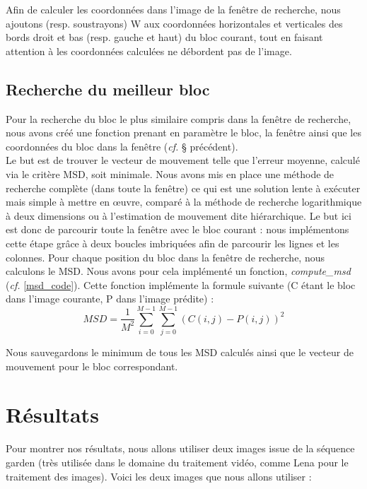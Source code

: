 \documentclass[a4paper, 12pt]{article}
\begin{document}
Afin de calculer les coordonnées dans l'image de la fenêtre de recherche, nous ajoutons (resp. soustrayons) W aux coordonnées horizontales et verticales des bords droit et bas (resp. gauche et haut) du bloc courant, tout en faisant attention à les coordonnées calculées ne débordent pas de l'image.


\subsection{Recherche du meilleur bloc}

Pour la recherche du bloc le plus similaire compris dans la fenêtre de recherche, nous avons créé une fonction prenant en paramètre le bloc, la fenêtre ainsi que les coordonnées du bloc dans la fenêtre (\textit{cf.} § précédent).\\

Le but est de trouver le vecteur de mouvement telle que l'erreur moyenne, calculé via le critère MSD, soit minimale. Nous avons mis en place une méthode de recherche complète (dans toute la fenêtre) ce qui est une solution lente à exécuter mais simple à mettre en œuvre, comparé à la méthode de recherche logarithmique à deux dimensions ou à l'estimation de mouvement dite hiérarchique. Le but ici est donc de parcourir toute la fenêtre avec le bloc courant : nous implémentons cette étape grâce à deux boucles imbriquées afin de parcourir les lignes et les colonnes. Pour chaque position du bloc dans la fenêtre de recherche, nous calculons le MSD. Nous avons pour cela implémenté un fonction, \textit{compute\_msd} (\textit{cf.} \ref{msd_code}). Cette fonction implémente la formule suivante (C étant le bloc dans l'image courante, P dans l'image prédite) :
\[ MSD = \frac{1}{M^2}\sum_{i=0}^{M-1}\sum_{j=0}^{M-1}(C(i,j) - P(i,j))^2 \]

Nous sauvegardons le minimum de tous les MSD calculés ainsi que le vecteur de mouvement pour le bloc correspondant.


\newpage
\section{Résultats}

Pour montrer nos résultats, nous allons utiliser deux images issue de la séquence garden (très utilisée dans le domaine du traitement vidéo, comme Lena pour le traitement des images). Voici les deux images que nous allons utiliser : 
\end{document}
